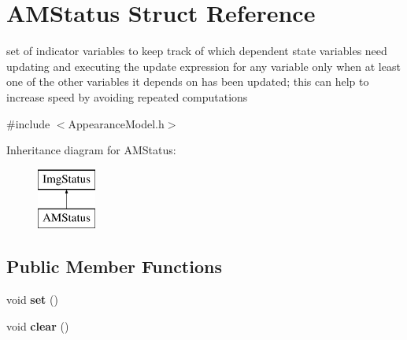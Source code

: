 \hypertarget{structAMStatus}{\section{A\-M\-Status Struct Reference}
\label{structAMStatus}
}


set of indicator variables to keep track of which dependent state variables need updating and executing the update expression for any variable only when at least one of the other variables it depends on has been updated; this can help to increase speed by avoiding repeated computations  




{\ttfamily \#include $<$Appearance\-Model.\-h$>$}

Inheritance diagram for A\-M\-Status\-:\begin{figure}[H]
\begin{center}
\leavevmode
\includegraphics[height=2.000000cm]{structAMStatus}
\end{center}
\end{figure}
\subsection*{Public Member Functions}
\begin{DoxyCompactItemize}
\item 
\hypertarget{structAMStatus_a58c0fe7c4625f1dc26701e65d2b7d6dc}{void {\bfseries set} ()}\label{structAMStatus_a58c0fe7c4625f1dc26701e65d2b7d6dc}

\item 
\hypertarget{structAMStatus_a59dbffa885af1ad239578eaf417c0eee}{void {\bfseries clear} ()}\label{structAMStatus_a59dbffa885af1ad239578eaf417c0eee}

\end{DoxyCompactItemize}
